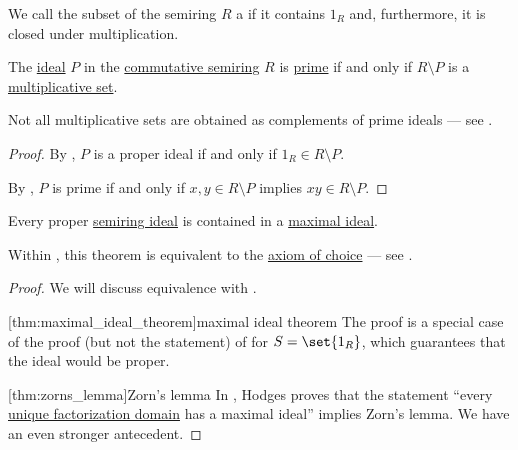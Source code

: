 \begin{definition}\label{def:multiplicative_set_in_semiring}
  We call the subset of the semiring \( R \) a  if it contains \( 1_R \) and, furthermore, it is closed under multiplication.
\end{definition}

\begin{proposition}\label{thm:complement_of_prime_ideal}
  The \hyperref[def:semiring_ideal]{ideal} \( P \) in the \hyperref[def:semiring/commutative]{commutative semiring} \( R \) is \hyperref[def:semiring_ideal/prime]{prime} if and only if \( R \setminus P \) is a \hyperref[def:multiplicative_set_in_semiring]{multiplicative set}.

  Not all multiplicative sets are obtained as complements of prime ideals --- see .
\end{proposition}
\begin{proof}
  By , \( P \) is a proper ideal if and only if \( 1_R \in R \setminus P \).

  By , \( P \) is prime if and only if \( x, y \in R \setminus P \) implies \( xy \in R \setminus P \).
\end{proof}

\begin{theorem}\label{thm:maximal_ideal_theorem}
  Every proper \hyperref[def:semiring_ideal]{semiring ideal} is contained in a \hyperref[def:semiring_ideal/maximal]{maximal ideal}.

  Within \hyperref[def:zfc]{}, this theorem is equivalent to the \hyperref[def:zfc/choice]{axiom of choice} --- see .
\end{theorem}
\begin{proof}
  We will discuss equivalence with .

  [thm:maximal_ideal_theorem]{maximal ideal theorem} The proof is a special case of the proof (but not the statement) of  for \( S = \set{ 1_R } \), which guarantees that the ideal would be proper.

  [thm:zorns_lemma]{Zorn's lemma} In \cite{Hodges1979}, Hodges proves that the statement \enquote{every \hyperref[def:unique_factorization_domain]{unique factorization domain} has a maximal ideal} implies Zorn's lemma. We have an even stronger antecedent.
\end{proof}

